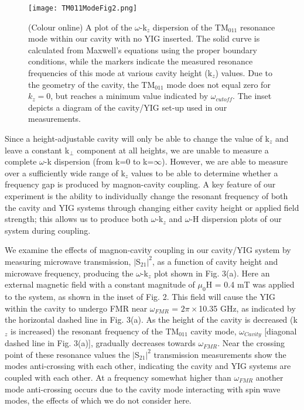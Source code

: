 \documentclass[prb,twocolumn,showpacs,preprintnumbers,amsmath,amssymb]{revtex4-1}
\begin{document}
\begin{figure}[t]
\centering
\texttt{[image: TM011ModeFig2.png]}
\caption{(Colour online) A plot of the $\omega$-k$_{z}$ dispersion of the TM$_{011}$ resonance mode within our cavity with no YIG inserted. The solid curve is calculated from Maxwell's equations using the proper boundary conditions, while the markers indicate the measured resonance frequencies of this mode at various cavity height (k$_{z}$) values. Due to the geometry of the cavity, the TM$_{011}$ mode does not equal zero for $k_{z}=0$, but reaches a minimum value indicated by $\omega_{cutoff}$. The inset depicts a diagram of the cavity/YIG set-up used in our measurements.}
\label{Figure 2}
\end{figure}


Since a height-adjustable cavity will only be able to change the value of k$_{z}$ and leave a constant k$_{\perp}$ component at all heights, we are unable to measure a complete $\omega$-k dispersion (from k=0 to k=$\infty$). However, we are able to measure over a sufficiently wide range of k$_{z}$ values to be able to determine whether a frequency gap is produced by magnon-cavity coupling. A key feature of our experiment is the ability to individually change the resonant frequency of both the cavity and YIG systems through changing either cavity height or applied field strength; this allows us to produce both $\omega$-k$_{z}$ and $\omega$-H dispersion plots of our system during coupling.

We examine the effects of magnon-cavity coupling in our cavity/YIG system by measuring microwave transmission, $|$S$_{21}|^{2}$, as a function of cavity height and microwave frequency, producing the $\omega$-k$_{z}$ plot shown in Fig. 3(a). Here an external magnetic field with a constant magnitude of $\mu_{0}$H = 0.4 mT was applied to the system, as shown in the inset of Fig. 2. This field will cause the YIG within the cavity to undergo FMR near $\omega_{FMR}$ = $2\pi\times$10.35 GHz, as indicated by the horizontal dashed line in Fig. 3(a). As the height of the cavity is decreased (k$_{z}$ is increased) the resonant frequency of the TM$_{011}$ cavity mode, $\omega_{Cavity}$ [diagonal dashed line in Fig. 3(a)], gradually decreases towards $\omega_{FMR}$. Near the crossing point of these resonance values the $|$S$_{21}|^{2}$ transmission measurements show the modes anti-crossing with each other, indicating the cavity and YIG systems are coupled with each other. At a frequency somewhat higher than $\omega_{FMR}$ another mode anti-crossing occurs due to the cavity mode interacting with spin wave modes, the effects of which we do not consider here.
\end{document}
